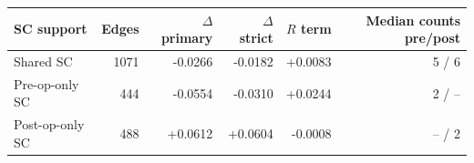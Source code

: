 \begin{tabular}{lrrrrr}
\toprule
SC support & Edges & $\Delta$ primary & $\Delta$ strict & $R$ term & Median counts pre/post \\
\midrule
Shared SC & 1071 & -0.0266 & -0.0182 & +0.0083 & 5 / 6 \\
Pre-op-only SC & 444 & -0.0554 & -0.0310 & +0.0244 & 2 / -- \\
Post-op-only SC & 488 & +0.0612 & +0.0604 & -0.0008 & -- / 2 \\
\bottomrule
\end{tabular}
